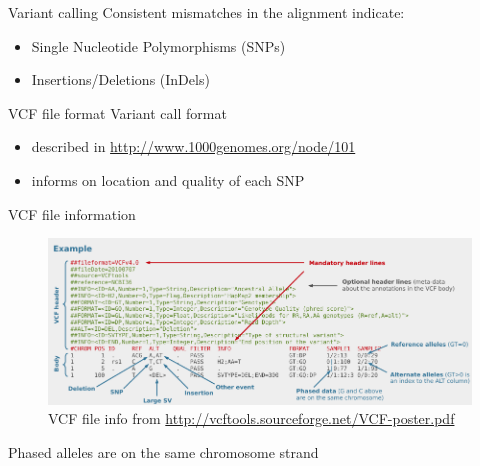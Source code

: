 \documentclass[presentation]{beamer}
\begin{document}
\begin{frame}[label=sec-3-1-13]{Variant calling}
Consistent mismatches in the alignment indicate:
\begin{itemize}
\item Single Nucleotide Polymorphisms (SNPs)
\item Insertions/Deletions (InDels)
\end{itemize}
\end{frame}

\begin{frame}[label=sec-3-1-14]{VCF file format}
Variant call format
\begin{itemize}
\item described in \url{http://www.1000genomes.org/node/101}
\item informs on location and quality of each SNP
\end{itemize}
\end{frame}
\begin{frame}[label=sec-3-1-15]{VCF file information}
\begin{center}

\begin{figure}[htb]
\centering
\includegraphics[width=11.5cm]{DanecekVcfFile.png}
\caption{VCF file info from \url{http://vcftools.sourceforge.net/VCF-poster.pdf}}
\end{figure}

Phased alleles are on the same chromosome strand
 \end{center}
\end{frame}
\end{document}
